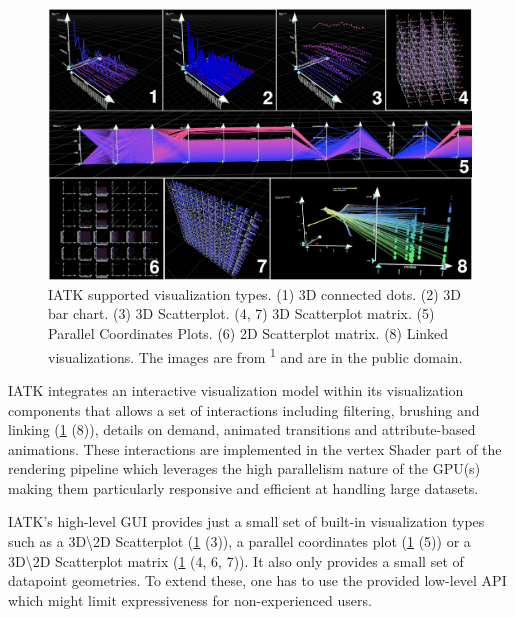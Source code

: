 \documentclass{vgtc}                          %
\begin{document}
\begin{figure}[tb]
	\centering
	\includegraphics[width=\columnwidth]{iatk}
	\caption[Caption for IATK]{IATK supported visualization types. (1) 3D
		connected dots. (2) 3D bar chart. (3) 3D Scatterplot. (4, 7) 3D
		Scatterplot matrix. (5) Parallel Coordinates Plots. (6) 2D Scatterplot
		matrix. (8) Linked visualizations. The images are from \textsuperscript{1}
		and are in the public domain.}
	\label{fig:iatk_visualizations}
\end{figure}


\smallskip

\noindent IATK integrates an interactive visualization model within its
visualization components that allows a set of interactions including filtering,
brushing and linking (\cref{fig:iatk_visualizations} (8)), details on demand,
animated transitions and attribute-based animations. These interactions are
implemented in the vertex Shader part of the rendering pipeline which leverages
the high parallelism nature of the GPU(s) making them particularly responsive
and efficient at handling large datasets.

\smallskip

\noindent IATK's high-level GUI provides just a small set of built-in visualization
types such as a 3D\textbackslash2D Scatterplot (\cref{fig:iatk_visualizations}
(3)), a parallel coordinates plot (\cref{fig:iatk_visualizations} (5)) or a
3D\textbackslash2D Scatterplot matrix (\cref{fig:iatk_visualizations} (4, 6, 7)).
It also only provides a small set of datapoint geometries. To extend these,
one has to use the provided low-level API which might limit expressiveness for
non-experienced users.

\smallskip
\end{document}
